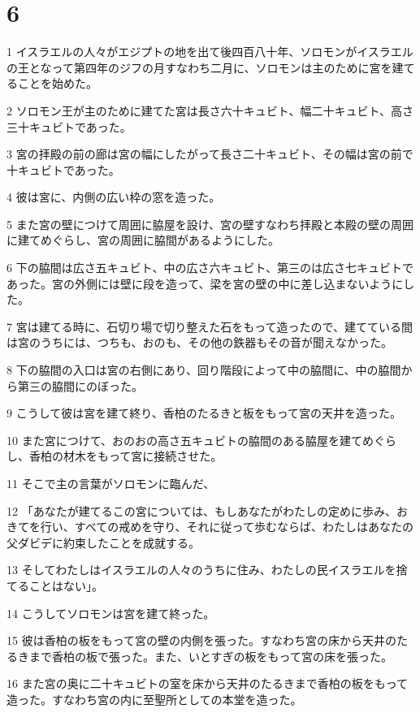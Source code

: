 \chapter{6}

\par 1 イスラエルの人々がエジプトの地を出て後四百八十年、ソロモンがイスラエルの王となって第四年のジフの月すなわち二月に、ソロモンは主のために宮を建てることを始めた。
\par 2 ソロモン王が主のために建てた宮は長さ六十キュビト、幅二十キュビト、高さ三十キュビトであった。
\par 3 宮の拝殿の前の廊は宮の幅にしたがって長さ二十キュビト、その幅は宮の前で十キュビトであった。
\par 4 彼は宮に、内側の広い枠の窓を造った。
\par 5 また宮の壁につけて周囲に脇屋を設け、宮の壁すなわち拝殿と本殿の壁の周囲に建てめぐらし、宮の周囲に脇間があるようにした。
\par 6 下の脇間は広さ五キュビト、中の広さ六キュビト、第三のは広さ七キュビトであった。宮の外側には壁に段を造って、梁を宮の壁の中に差し込まないようにした。
\par 7 宮は建てる時に、石切り場で切り整えた石をもって造ったので、建てている間は宮のうちには、つちも、おのも、その他の鉄器もその音が聞えなかった。
\par 8 下の脇間の入口は宮の右側にあり、回り階段によって中の脇間に、中の脇間から第三の脇間にのぼった。
\par 9 こうして彼は宮を建て終り、香柏のたるきと板をもって宮の天井を造った。
\par 10 また宮につけて、おのおの高さ五キュビトの脇間のある脇屋を建てめぐらし、香柏の材木をもって宮に接続させた。
\par 11 そこで主の言葉がソロモンに臨んだ、
\par 12 「あなたが建てるこの宮については、もしあなたがわたしの定めに歩み、おきてを行い、すべての戒めを守り、それに従って歩むならば、わたしはあなたの父ダビデに約束したことを成就する。
\par 13 そしてわたしはイスラエルの人々のうちに住み、わたしの民イスラエルを捨てることはない」。
\par 14 こうしてソロモンは宮を建て終った。
\par 15 彼は香柏の板をもって宮の壁の内側を張った。すなわち宮の床から天井のたるきまで香柏の板で張った。また、いとすぎの板をもって宮の床を張った。
\par 16 また宮の奥に二十キュビトの室を床から天井のたるきまで香柏の板をもって造った。すなわち宮の内に至聖所としての本堂を造った。
